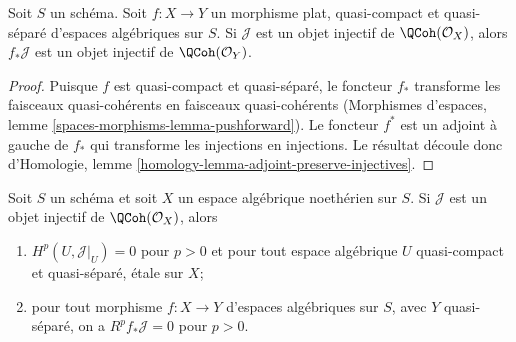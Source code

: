 \begin{lemma}
\label{lemma-flat-pullback-injective-quasi-coherent}
Soit $S$ un sch\'ema. Soit $f : X \to Y$ un morphisme plat,
quasi-compact et quasi-s\'epar\'e d'espaces alg\'ebriques sur $S$. Si
$\mathcal{J}$ est un objet injectif de $\QCoh(\mathcal{O}_X)$,
alors $f_*\mathcal{J}$ est un objet injectif de
$\QCoh(\mathcal{O}_Y)$.
\end{lemma}

\begin{proof}
Puisque $f$ est quasi-compact et quasi-s\'epar\'e, le foncteur
$f_*$ transforme les faisceaux quasi-coh\'erents en faisceaux
quasi-coh\'erents (Morphismes d'espaces, lemme
\ref{spaces-morphisms-lemma-pushforward}). Le foncteur $f^*$ est un adjoint
\`a gauche de $f_*$ qui transforme les injections en injections.
Le r\'esultat d\'ecoule donc d'Homologie, lemme
\ref{homology-lemma-adjoint-preserve-injectives}.
\end{proof}

\begin{lemma}
\label{lemma-injective-pushforward}
Soit $S$ un sch\'ema et soit $X$ un espace alg\'ebrique noeth\'erien sur $S$.
Si $\mathcal{J}$ est un objet injectif de $\QCoh(\mathcal{O}_X)$, alors
\begin{enumerate}
\item $H^p(U, \mathcal{J}|_U) = 0$ pour $p > 0$ et pour tout espace
alg\'ebrique $U$ quasi-compact et quasi-s\'epar\'e, \'etale sur $X$;
\item pour tout morphisme $f : X \to Y$ d'espaces alg\'ebriques sur $S$,
avec $Y$ quasi-s\'epar\'e, on a $R^pf_*\mathcal{J} = 0$ pour $p > 0$.
\end{enumerate}
\end{lemma}

